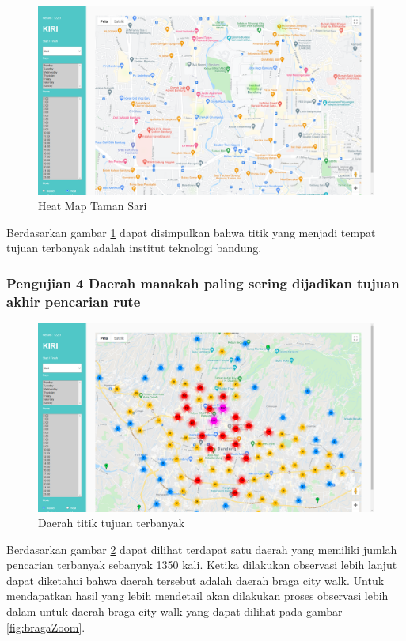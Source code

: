 \begin{figure}[H]
	\centering  
	\includegraphics[scale=0.3]{Gambar/pengujian/hasil-heat-map.png}  
	\caption[Heat Map Taman Sari]{Heat Map Taman Sari} 
	\label{fig:heatMapTamanSari}
\end{figure}

Berdasarkan gambar \ref{fig:heatMapTamanSari} dapat disimpulkan bahwa titik yang menjadi tempat tujuan terbanyak adalah institut teknologi bandung.

\subsubsection{Pengujian 4  Daerah manakah  paling sering dijadikan tujuan akhir pencarian rute}
\label{subsec:pengujian4}
\begin{figure}[H]
	\centering  
	\includegraphics[scale=0.3]{Gambar/pengujian/titik-tujuan-terbanyak.png}  
	\caption[Daerah titik tujuan terbanyak]{Daerah titik tujuan terbanyak} 
	\label{fig:titikTujuan}
\end{figure}

Berdasarkan gambar \ref{fig:titikTujuan} dapat dilihat terdapat satu daerah yang memiliki jumlah pencarian terbanyak sebanyak 1350 kali. Ketika dilakukan observasi lebih lanjut dapat diketahui bahwa daerah tersebut adalah daerah braga city walk. Untuk mendapatkan hasil yang lebih mendetail akan dilakukan proses observasi lebih dalam untuk daerah braga city walk yang dapat dilihat pada gambar \ref{fig:bragaZoom}.

